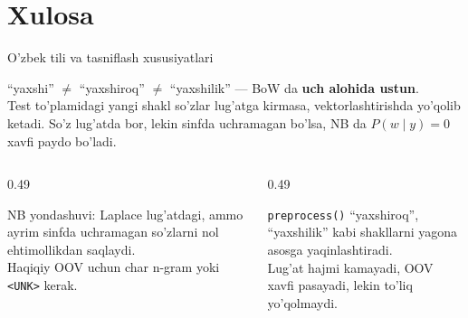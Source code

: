 \documentclass[aspectratio=169,11pt]{beamer}
\begin{document}
\section[Xulosa]{Xulosa}

\begin{frame}{O'zbek tili va tasniflash xususiyatlari}
  \begin{tcolorbox}[warnbox,title=Agglutinativ til va BoW muammosi]
    \small
    ``yaxshi'' $\neq$ ``yaxshiroq'' $\neq$ ``yaxshilik'' ---
    BoW da \textbf{uch alohida ustun}.\\
    Test to'plamidagi yangi shakl so'zlar lug'atga kirmasa, vektorlashtirishda yo'qolib ketadi.
    So'z lug'atda bor, lekin sinfda uchramagan bo'lsa, NB da
    $P(w\mid y){=}0$ xavfi paydo bo'ladi.
  \end{tcolorbox}
  \vspace{4pt}
  \begin{columns}[T]
    \begin{column}{0.49\textwidth}
      \begin{tcolorbox}[defbox,title=NB yondashuvi]
        \small
        NB yondashuvi: Laplace lug'atdagi, ammo ayrim sinfda uchramagan so'zlarni
        nol ehtimollikdan saqlaydi.\\
        Haqiqiy OOV uchun char n-gram yoki \texttt{<UNK>} kerak.
      \end{tcolorbox}
    \end{column}
    \begin{column}{0.49\textwidth}
      \begin{tcolorbox}[okbox,title=Yechim: preprocessing va n-gramlar]
        \small
        \texttt{preprocess()} ``yaxshiroq'', ``yaxshilik'' kabi shakllarni
        yagona asosga yaqinlashtiradi.\\
        Lug'at hajmi kamayadi, OOV xavfi pasayadi, lekin to'liq yo'qolmaydi.
      \end{tcolorbox}
    \end{column}
  \end{columns}
\end{frame}
\end{document}
